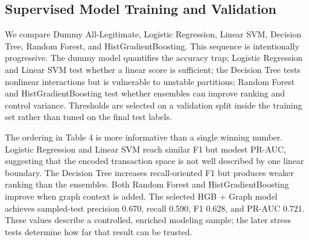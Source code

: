 \documentclass{article}
\begin{document}
\subsection{Supervised Model Training and Validation}
We compare Dummy All-Legitimate, Logistic Regression, Linear SVM, Decision Tree, Random Forest, and HistGradientBoosting. This sequence is intentionally progressive. The dummy model quantifies the accuracy trap; Logistic Regression and Linear SVM test whether a linear score is sufficient; the Decision Tree tests nonlinear interactions but is vulnerable to unstable partitions; Random Forest and HistGradientBoosting test whether ensembles can improve ranking and control variance. Thresholds are selected on a validation split inside the training set rather than tuned on the final test labels.
\begin{table}[H]
\centering
\caption{Sampled-test model comparison.}
\end{table}

The ordering in Table 4 is more informative than a single winning number. Logistic Regression and Linear SVM reach similar F1 but modest PR-AUC, suggesting that the encoded transaction space is not well described by one linear boundary. The Decision Tree increases recall-oriented F1 but produces weaker ranking than the ensembles. Both Random Forest and HistGradientBoosting improve when graph context is added. The selected HGB + Graph model achieves sampled-test precision 0.670, recall 0.590, F1 0.628, and PR-AUC 0.721. These values describe a controlled, enriched modeling sample; the later stress tests determine how far that result can be trusted.
\end{document}
